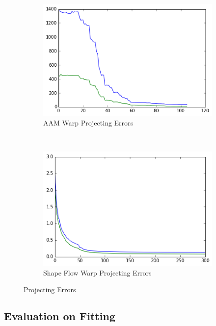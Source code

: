 \begin{figure}[h!]
    \centering
    \begin{subfigure}[b]{0.2\textwidth}
            \includegraphics[width=\textwidth]{resources/warp_projecting_error_aam}
        \caption{AAM Warp Projecting Errors}
        \label{}
    \end{subfigure}
    ~~
    \begin{subfigure}[b]{0.2\textwidth}
            \includegraphics[width=\textwidth]{resources/warp_projecting_error_of}
        \caption{Shape Flow Warp Projecting Errors}
    \end{subfigure}
    \caption{Projecting Errors}
\end{figure}


\subsection{Evaluation on Fitting}


